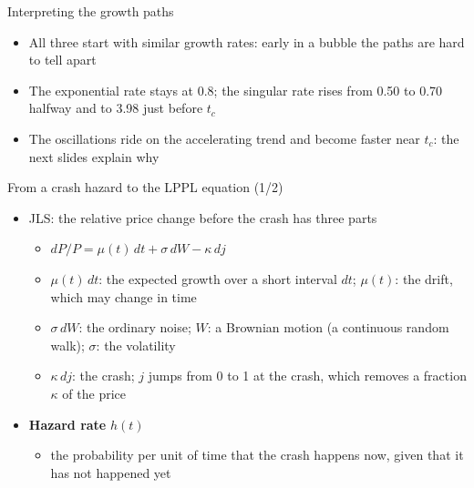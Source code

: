 \begin{frame}{Interpreting the growth paths}
\itemsize{\small}
\begin{itemize}
    \item All three start with similar growth rates: early in a bubble the paths are hard to tell apart
    \item The exponential rate stays at 0.8; the singular rate rises from 0.50 to 0.70 halfway and to 3.98 just before $t_c$
    \item The oscillations ride on the accelerating trend and become faster near $t_c$: the next slides explain why
\end{itemize}
\end{frame}

\begin{frame}{From a crash hazard to the LPPL equation (1/2)}
\itemsize{\footnotesize}
\begin{itemize}
    \item JLS: the relative price change before the crash has three parts
    \begin{itemize}
        \item $dP/P = \mu(t)\,dt + \sigma\,dW - \kappa\, dj$
        \item $\mu(t)\,dt$: the expected growth over a short interval $dt$; $\mu(t)$: the drift, which may change in time
        \item $\sigma\,dW$: the ordinary noise; $W$: a Brownian motion (a continuous random walk); $\sigma$: the volatility
        \item $\kappa\, dj$: the crash; $j$ jumps from 0 to 1 at the crash, which removes a fraction $\kappa$ of the price
    \end{itemize}
    \item \textbf{Hazard rate} $h(t)$
    \begin{itemize}
        \item the probability per unit of time that the crash happens now, given that it has not happened yet
    \end{itemize}
\end{itemize}
\end{frame}

